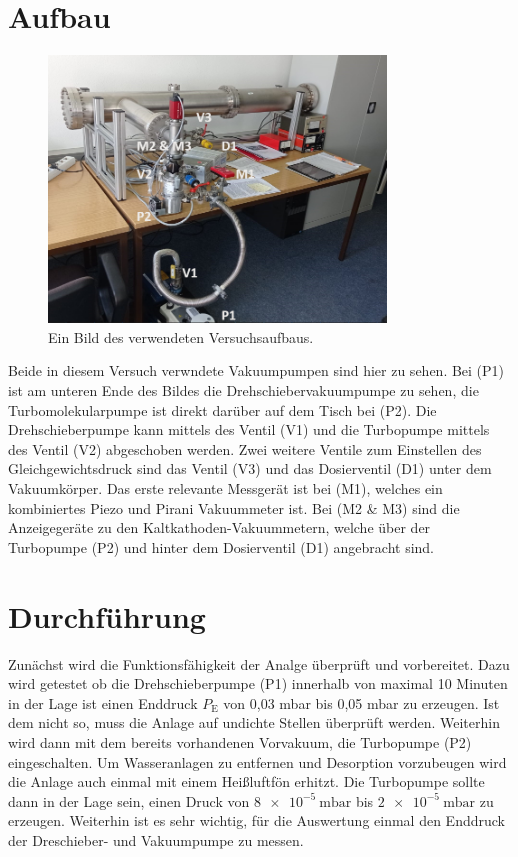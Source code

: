 \section{Aufbau}
		
	\begin{figure}
		\centering
		\includegraphics[width=0.8\textwidth]{"latex/images/Aufbau_beschriftet.png"}
		\caption{Ein Bild des verwendeten Versuchsaufbaus.}
		\label{fig:auf}
	\end{figure}		
	Beide in diesem Versuch verwndete Vakuumpumpen sind hier zu sehen.
	Bei (P1) ist am unteren Ende des Bildes die Drehschiebervakuumpumpe zu sehen, die Turbomolekularpumpe ist direkt darüber auf dem Tisch bei (P2).
	Die Drehschieberpumpe kann mittels des Ventil (V1) und die Turbopumpe mittels des Ventil (V2) abgeschoben werden.
	Zwei weitere Ventile zum Einstellen des Gleichgewichtsdruck sind das Ventil (V3) und das Dosierventil (D1) unter dem Vakuumkörper.
	Das erste relevante Messgerät ist bei (M1), welches ein kombiniertes Piezo und Pirani Vakuummeter ist.
	Bei (M2 \& M3) sind die Anzeigegeräte zu den Kaltkathoden-Vakuummetern, welche über der Turbopumpe (P2) und hinter dem Dosierventil (D1) angebracht sind.

\section{Durchführung}
	Zunächst wird die Funktionsfähigkeit der Analge überprüft und vorbereitet. 
	Dazu wird getestet ob die Drehschieberpumpe (P1) innerhalb von maximal 10 Minuten in der Lage ist einen Enddruck $P_\text{E}$ von 0,03 mbar bis 0,05 mbar zu erzeugen. 
	Ist dem nicht so, muss die Anlage auf undichte Stellen überprüft werden.
	Weiterhin wird dann mit dem bereits vorhandenen Vorvakuum, die Turbopumpe (P2) eingeschalten. 
	Um Wasseranlagen zu entfernen und Desorption vorzubeugen wird die Anlage auch einmal mit einem Heißluftfön erhitzt.
	Die Turbopumpe sollte dann in der Lage sein, einen Druck von $\SI{8 e-5}{\milli\bar}$ bis $\SI{2 e-5}{\milli\bar}$ zu erzeugen.
	Weiterhin ist es sehr wichtig, für die Auswertung einmal den Enddruck der Dreschieber- und Vakuumpumpe zu messen.	


